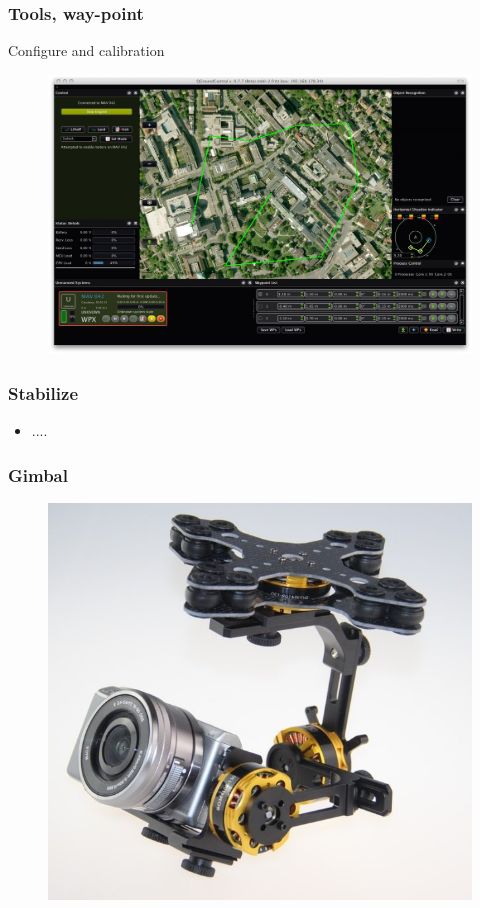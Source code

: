 \begin{frame}
\frametitle{Tools, way-point}

  Configure and calibration
  \begin{figure}
  \includegraphics[scale=0.17]{pic/03_our-copter/qgroundcontrol.png}
  \end{figure}
\end{frame}

\begin{frame}
\frametitle{Stabilize}

  \begin{itemize}
    \item ....    
  \end{itemize}
\end{frame}

\begin{frame}
\frametitle{Gimbal}

  \begin{figure}
  \includegraphics[scale=0.4]{pic/03_our-copter/gimbal.jpg}
  \end{figure}

  
\end{frame}

